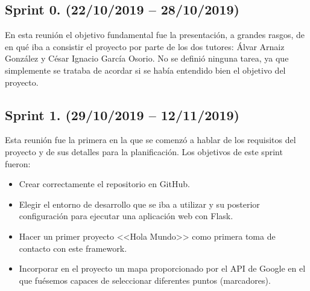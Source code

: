 \subsection{Sprint 0. (22/10/2019 -- 28/10/2019)}
En esta reunión el objetivo fundamental fue la presentación, a grandes rasgos, de en qué iba a consistir el proyecto por parte de los dos tutores: Álvar Arnaiz González y César Ignacio García Osorio.
No se definió ninguna tarea, ya que simplemente se trataba de acordar si se había entendido bien el objetivo del proyecto.

\subsection{Sprint 1. (29/10/2019 -- 12/11/2019)}
Esta reunión fue la primera en la que se comenzó a hablar de los requisitos del proyecto y de sus detalles para la planificación.
Los objetivos de este sprint fueron:
\begin{itemize}
	\item Crear correctamente el repositorio en GitHub.
	\item Elegir el entorno de desarrollo que se iba a utilizar y su posterior configuración para ejecutar una aplicación web con Flask.
	\item Hacer un primer proyecto <<Hola Mundo>> como primera toma de contacto con este framework.
	\item Incorporar en el proyecto un mapa proporcionado por el API de Google en el que fuésemos capaces de seleccionar diferentes puntos (marcadores).
\end{itemize}



